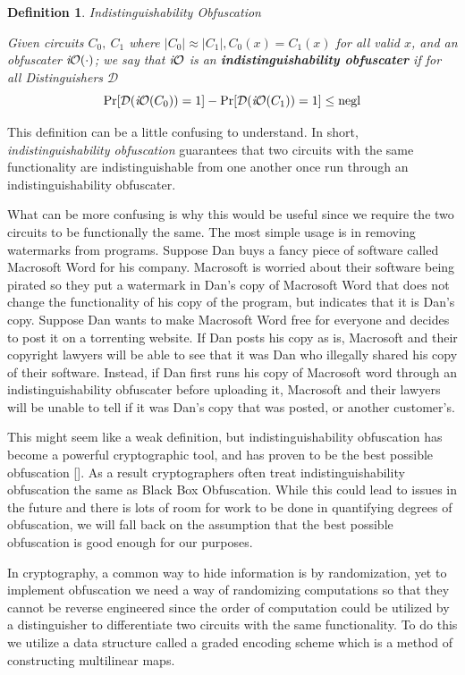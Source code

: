 \documentclass[12pt,twoside]{reedthesis}
\newtheorem{definition}{Definition}
\begin{document}
    \begin{definition}{Indistinguishability Obfuscation}
    \par Given circuits $C_0,\ C_1$ where $|C_0| \approx |C_1|, C_0(x) = C_1(x)$ for all valid $x$, and an obfuscater $\textit{i}\mathcal{O}(\cdot)$; we say that $\textit{i}\mathcal{O}$ is an \textbf{indistinguishability obfuscater} if for all Distinguishers $\mathcal{D}$
    $$\Pr[\mathcal{D}(\textit{i}\mathcal{O}(C_0)) = 1] -\Pr[\mathcal{D}(\textit{i}\mathcal{O}(C_1)) = 1] \leq \text{negl}$$
    \end{definition}
    
    \par This definition can be a little confusing to understand. In short, \textit{indistinguishability obfuscation} guarantees that two circuits with the same functionality are indistinguishable from one another once run through an indistinguishability obfuscater. 
    \par What can be more confusing is why this would be useful since we require the two circuits to be functionally the same. The most simple usage is in removing watermarks from programs. Suppose Dan buys a fancy piece of software called Macrosoft Word for his company. Macrosoft is worried about their software being pirated so they put a watermark in Dan's copy of Macrosoft Word that does not change the functionality of his copy of the program, but indicates that it is Dan's copy. Suppose Dan wants to make Macrosoft Word free for everyone and decides to post it on a torrenting website. If Dan posts his copy as is, Macrosoft and their copyright lawyers will be able to see that it was Dan who illegally shared his copy of their software. Instead, if Dan first runs his copy of Macrosoft word through an indistinguishability obfuscater before uploading it, Macrosoft and their lawyers will be unable to tell if it was Dan's copy that was posted, or another customer's.
    \par This might seem like a weak definition, but indistinguishability obfuscation has become a powerful cryptographic tool, and has proven to be the best possible obfuscation [\cite{Goldwasser:2007:BO:1760749.1760765}]. As a result cryptographers often treat indistinguishability obfuscation the same as Black Box Obfuscation. While this could lead to issues in the future and there is lots of room for work to be done in quantifying degrees of obfuscation, we will fall back on the assumption that the best possible obfuscation is good enough for our purposes.
    \par In cryptography, a common way to hide information is by randomization, yet to implement obfuscation we need a way of randomizing computations so that they cannot be reverse engineered since the order of computation could be utilized by a distinguisher to differentiate two circuits with the same functionality. To do this we utilize a data  structure called a graded encoding scheme which is a method of constructing multilinear maps. 
    
\end{document}
